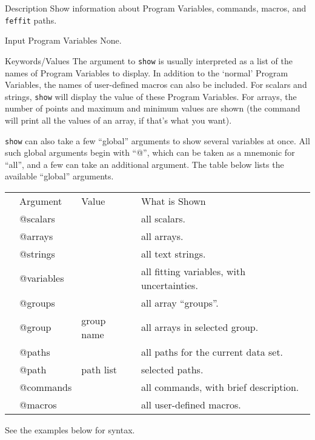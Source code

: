 \begin{IFFcom}
\item[Description] Show information about {\ifeffit} Program Variables,
  commands, macros, and {\tt{feffit}} paths.
\item[Input Program Variables] None.
\item[Keywords/Values] The argument to {\tt{show}} is usually interpreted
  as a list of the names of Program Variables to display.  In addition to
  the `normal' Program Variables, the names of user-defined macros can also
  be included.  For scalars and strings, {\tt{show}} will display the value
  of these  Program Variables.  For arrays, the number of points and
  maximum and minimum values are shown (the {} command will
  print all the values of an array, if that's what you want). 
  
  {\tt{show}} can also take a few ``global'' arguments to show several
  variables at once.  All such global arguments begin with ``@'', which can
  be taken as a mnemonic for ``all'', and a few can take an additional
  argument. The table below lists the available ``global'' arguments.
  \begin{center}  \begin{tabular}{clll} 
    \hspace{0.025in} &Argument & Value & What is Shown  \\ \noalign{\smallskip}
    &{@scalars}  & & all scalars. \\ 
    &{@arrays}   & & all arrays.\\
    &{@strings}  & & all text strings.\\
    &{@variables}& & all fitting variables, with uncertainties.\\
    &{@groups}   & & all array ``groups''.\\
    &{@group}    & group name & all arrays in selected group.\\
    &{@paths}    &      & all paths for the current data set.\\
    &{@path}     & path list  & selected paths.\\
    &{@commands} & & all commands, with brief description. \\ 
    &{@macros}   & & all user-defined macros.\\
  \end{tabular}\end{center} 
\noindent
See the examples below for syntax.


\end{IFFcom}
